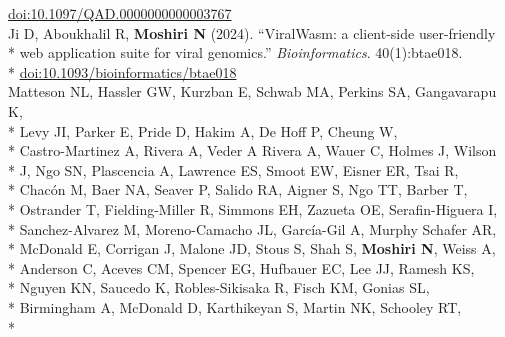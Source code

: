 \documentclass[margin,line]{res}
\begin{document}
\begin{resume}
\hspace*{8mm} \href{https://doi.org/10.1097/QAD.0000000000003767}{doi:10.1097/QAD.0000000000003767}\\
\hspace*{4mm} Ji D, Aboukhalil R, \textbf{Moshiri N} (2024). ``ViralWasm: a client-side user-friendly\\*
\hspace*{9.5mm} web application suite for viral genomics.'' \textit{Bioinformatics}. 40(1):btae018.\\*\vspace{2mm}
\hspace*{8mm} \href{https://doi.org/10.1093/bioinformatics/btae018}{doi:10.1093/bioinformatics/btae018}\\
\hspace*{4mm} Matteson NL, Hassler GW, Kurzban E, Schwab MA, Perkins SA, Gangavarapu K,\\*
\hspace*{9.5mm} Levy JI, Parker E, Pride D, Hakim A, De Hoff P, Cheung W,\\*
\hspace*{9.5mm} Castro-Martinez A, Rivera A, Veder A Rivera A, Wauer C, Holmes J, Wilson\\*
\hspace*{9.5mm} J, Ngo SN, Plascencia A, Lawrence ES, Smoot EW, Eisner ER, Tsai R,\\*
\hspace*{9.5mm} Chac\'{o}n M, Baer NA, Seaver P, Salido RA, Aigner S, Ngo TT, Barber T,\\*
\hspace*{9.5mm} Ostrander T, Fielding-Miller R, Simmons EH, Zazueta OE, Serafin-Higuera I,\\*
\hspace*{9.5mm} Sanchez-Alvarez M, Moreno-Camacho JL, García-Gil A, Murphy Schafer AR,\\*
\hspace*{9.5mm} McDonald E, Corrigan J, Malone JD, Stous S, Shah S, \textbf{Moshiri N}, Weiss A,\\*
\hspace*{9.5mm} Anderson C, Aceves CM, Spencer EG, Hufbauer EC, Lee JJ, Ramesh KS,\\*
\hspace*{9.5mm} Nguyen KN, Saucedo K, Robles-Sikisaka R, Fisch KM, Gonias SL,\\*
\hspace*{9.5mm} Birmingham A, McDonald D, Karthikeyan S, Martin NK, Schooley RT,\\*

\end{resume}
\end{document}
